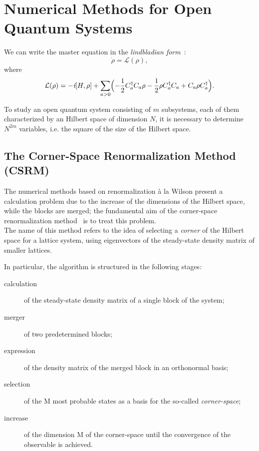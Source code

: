 \chapter{Numerical Methods for Open Quantum Systems}
We can write the master equation in the \emph{lindbladian form}~\cite{presk:quant_info}:
\begin{equation}
    \dot{\rho} = \mathcal{L}(\rho),
\end{equation}
where
\begin{equation}
\label{eqn:lindblad_eqn}
    \mathcal{L}(\rho) = -\emph{i}[H, \rho] + \sum_{a>0}     \Bigl(-\frac{1}{2}C^{\dagger}_a C_a \rho - \frac{1}{2}\rho C_a^{\dagger}C_a + C_a\rho C^{\dagger}_a \Bigl).
\end{equation}

To study an open quantum system consisting of $m$ subsystems, each of them characterized by an Hilbert space of dimension $N$, it is necessary to determine $N^{2m}$ variables, i.e. the square of the size of the Hilbert space.

\section{The Corner-Space Renormalization Method (CSRM)}
The numerical methods based on renormalization à la Wilson present a calculation problem due to the increase of the dimensions of the Hilbert space, while the blocks are merged; the fundamental aim of the corner-space renormalization method~\cite{PhysRevLett.115.080604} is to treat this problem. \\
The name of this method refers to the idea of selecting a \emph{corner} of the Hilbert space for a lattice system, using eigenvectors of the steady-state density matrix of smaller lattices.

In particular, the algorithm is structured in the following stages:
\begin{description}
    \item[calculation] of the steady-state density matrix of a single block of the system;
    \item[merger] of two predetermined blocks;
    \item[expression] of the density matrix of the merged block in an orthonormal basis;
    \item[selection] of the M most probable states as a basis for the so-called \emph{corner-space};
    \item[increase] of the dimension M of the corner-space until the convergence of the observable is achieved.
\end{description}

